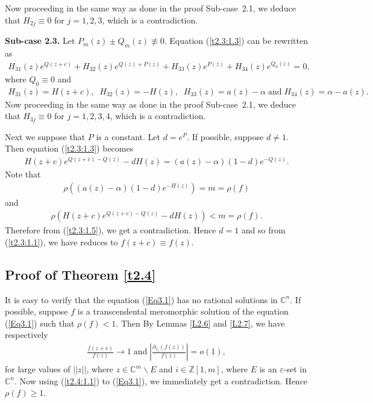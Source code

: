 \documentclass[11pt,reqno]{amsart}
\numberwithin{equation}{section}
\begin{document}
Now proceeding in the same way as done in the proof Sub-case~2.1, we deduce that $H_{2j}\equiv 0$ for $j = 1,2,3$, which is a contradiction.

\medskip
\noindent
\textbf{Sub-case 2.3.} Let $P_m(z)\pm Q_m(z)\not\equiv 0$. Equation (\ref{t2.3:1.3}) can be rewritten as
\begin{align*}
H_{31}(z)e^{Q(z+c)} + H_{32}(z)e^{Q(z)+P(z)}+ H_{33}(z)e^{P(z)} + H_{34}(z)e^{Q_{0}(z)}=0,
\end{align*}
where $Q_{0}\equiv 0$ and
\begin{align*}
H_{31}(z) = H(z+c),\;\;H_{32}(z)= -H(z),\;\;H_{33}(z)= a(z) - \alpha\;\text{and}\;H_{34}(z) = \alpha - a(z).
\end{align*}
Now proceeding in the same way as done in the proof Sub-case~2.1, we deduce that $H_{3j}\equiv 0$ for $j=1,2,3,4$, which is a contradiction.
\vspace{1.2mm}

Next we suppose that $P$ is a constant. Let $d=e^{P}$. If possible, suppose $d\neq 1$. Then equation (\ref{t2.3:1.3}) becomes
\begin{align}\label{t2.3:1.5}
H(z+c)e^{Q(z+c)-Q(z)}-dH(z)=(a(z)-\alpha)(1-d)e^{-Q(z)}.
\end{align}
Note that
\begin{align*}
\rho\!\left((a(z)-\alpha)(1-d)e^{-H(z)}\right)=m= \rho(f)
\end{align*}
and
\begin{align*}
\rho\!\left(H(z+c)e^{Q(z+c)-Q(z)}-dH(z)\right)<m= \rho(f).
\end{align*}
Therefore from (\ref{t2.3:1.5}), we get a contradiction. Hence $d=1$ and so from (\ref{t2.3:1.1}), we have reduces to $f(z+c) \equiv f(z)$.


\subsection{{Proof of Theorem \ref{t2.4}}} It is easy to verify that the equation
(\ref{Eq3.1}) has no rational solutions in $\mathbb{C}^n$. If possible, suppose $f$ is a transcendental meromorphic solution of the equation (\ref{Eq3.1}) such that $\rho(f)<1$. Then By Lemmas \ref{L2.6} and \ref{L2.7}, we have respectively
\begin{align}\label{t2.4:1.1}
\displaystyle \frac{f(z+c)}{f(z)}\rightarrow 1 \;\text{and}\; \left|\frac{\partial_{z_i}(f(z))}{f(z)}\right|=o(1),
\end{align}
for large values of $||z||$, where $z\in \mathbb{C}^m\backslash E$ and $i\in\mathbb{Z}[1,m]$, where $E$ is an $\varepsilon$-set in $\mathbb{C}^n$. Now using (\ref{t2.4:1.1}) to (\ref{Eq3.1}), we immediately get a contradiction. Hence $\rho(f)\geq 1$.
\end{document}
